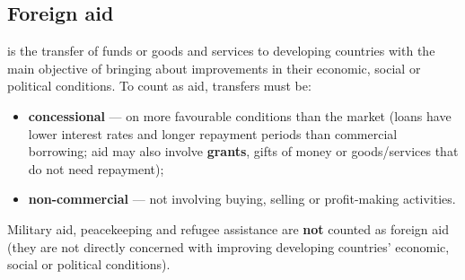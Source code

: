 \subsection{Foreign aid}
 is the transfer of funds or goods and services to developing countries with the main objective of bringing about improvements in their economic, social or political conditions. To count as aid, transfers must be:
\begin{itemize}
  \item \textbf{concessional} --- on more favourable conditions than the market (loans have lower interest rates and longer repayment periods than commercial borrowing; aid may also involve \textbf{grants}, gifts of money or goods/services that do not need repayment);
  \item \textbf{non-commercial} --- not involving buying, selling or profit-making activities.
\end{itemize}
Military aid, peacekeeping and refugee assistance are \textbf{not} counted as foreign aid (they are not directly concerned with improving developing countries' economic, social or political conditions).
